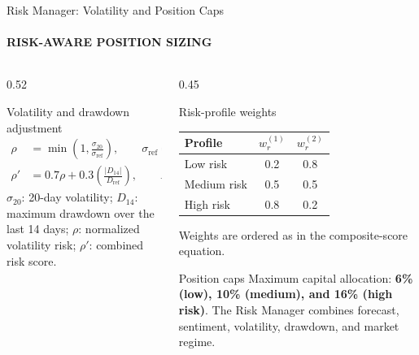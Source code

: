 \documentclass[aspectratio=169,11pt]{beamer}
\newcommand{\keyphrase}[1]{\textbf{\color{DELCONred}#1}}
\begin{document}
\begin{frame}{Risk Manager: Volatility and Position Caps}
  \framesubtitle{RISK-AWARE POSITION SIZING}
  \begin{columns}[T,onlytextwidth]
    \begin{column}{0.52\textwidth}
      \begin{block}{Volatility and drawdown adjustment}
        \centering\small
        \begin{align*}
          \rho&=\min\left(1,\frac{\sigma_{20}}{\sigma_{\mathrm{ref}}}\right),\qquad \sigma_{\mathrm{ref}}=0.03,\\
          \rho'&=0.7\rho+0.3\left(\frac{|D_{14}|}{D_{\mathrm{ref}}}\right),\qquad D_{\mathrm{ref}}=0.15.
        \end{align*}
        \scriptsize $\sigma_{20}$: 20-day volatility; $D_{14}$: maximum drawdown over the last 14 days; $\rho$: normalized volatility risk; $\rho'$: combined risk score.
      \end{block}
    \end{column}
    \begin{column}{0.45\textwidth}
      \begin{block}{Risk-profile weights}
        \centering\scriptsize
        \begin{tabular}{lcc}
          \toprule
          Profile & $w_r^{(1)}$ & $w_r^{(2)}$ \\
          \midrule
          Low risk & 0.2 & 0.8 \\
          Medium risk & 0.5 & 0.5 \\
          High risk & 0.8 & 0.2 \\
          \bottomrule
        \end{tabular}
        \par\tiny Weights are ordered as in the composite-score equation.
      \end{block}
      \begin{alertblock}{Position caps}
        \scriptsize Maximum capital allocation: \keyphrase{6\% (low), 10\% (medium), and 16\% (high risk)}. The Risk Manager combines forecast, sentiment, volatility, drawdown, and market regime.
      \end{alertblock}
    \end{column}
  \end{columns}
\end{frame}
\end{document}

